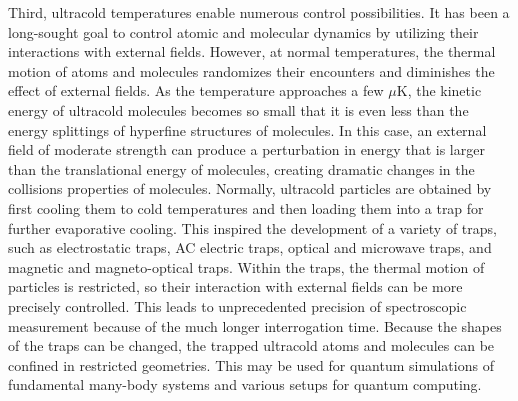 Third, ultracold temperatures enable numerous control possibilities. It has been a long-sought goal to control atomic and 
molecular dynamics by utilizing their interactions with external fields. However, at normal temperatures, the thermal 
motion of atoms and molecules randomizes their encounters and diminishes the effect of external fields. As the temperature
approaches a few $\mu$K, the kinetic energy of ultracold molecules becomes so small  that it is even less than 
the energy splittings of hyperfine structures of molecules. In this case, an external field of moderate strength can produce a perturbation
in energy that is larger than the translational energy of molecules, creating dramatic changes in the collisions properties of
molecules\cite{krems2005}. Normally, ultracold particles are obtained by first cooling them to cold temperatures and then loading them into a trap for further evaporative cooling\cite{metcalf1999}. 
This inspired the development of a variety of 
traps, such as electrostatic traps\cite{bethlem2000}, AC electric traps\cite{vanVeldhoven2005}, optical and microwave
traps\cite{optical-lattice-review, deMille2004}, and magnetic and magneto-optical traps\cite{hogan2008, 
vanhaecke2002, wang2004}. Within the traps, the thermal motion of particles is restricted, so their
interaction with external fields can be more precisely controlled. This leads to unprecedented precision of 
spectroscopic measurement because of the much longer  interrogation time\cite{vandeMeerakker2005, 
gilijamse2007, campbell2008}. Because the shapes of the traps can be changed, the trapped ultracold atoms and 
molecules can be confined in restricted geometries. This may be used for quantum simulations of 
fundamental many-body systems\cite{Baranov2012} and various setups for quantum computing\cite{brennen1999,
jaksch1999, pachos2003, kay2004, micheli2006, buchler2007a, bloch2008}.  


